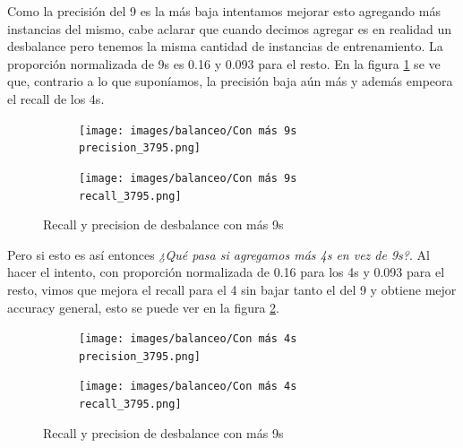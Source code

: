 Como la precisión del 9 es la más baja intentamos mejorar esto agregando más instancias del mismo, cabe aclarar que cuando decimos agregar es en realidad un desbalance pero tenemos la misma cantidad de instancias de entrenamiento. La proporción normalizada de 9s es 0.16 y 0.093 para el resto. En la figura \ref{fig:9s_recall_prec} se ve que, contrario a lo que suponíamos, la precisión baja aún más y además empeora el recall de los 4s.
\begin{figure}[h]
    \centering
    \begin{subfigure}{.5\textwidth}
        \centering
        \texttt{[image: images/balanceo/Con más 9s precision\_3795.png]}
    \end{subfigure}%
    \begin{subfigure}{.5\textwidth}
        \centering
        \texttt{[image: images/balanceo/Con más 9s recall\_3795.png]}
    \end{subfigure}%
    \caption{Recall y precision de desbalance con más 9s}
    \label{fig:9s_recall_prec}
\end{figure}

Pero si esto es así entonces \textit{¿Qué pasa si agregamos más 4s en vez de 9s?}. Al hacer el intento, con proporción normalizada de 0.16 para los 4s y 0.093 para el resto, vimos que mejora el recall para el 4 sin bajar tanto el del 9 y obtiene mejor accuracy general, esto se puede ver en la figura \ref{fig:4s_recall_prec}.
\begin{figure}[h]
    \centering
    \begin{subfigure}{.5\textwidth}
        \centering
        \texttt{[image: images/balanceo/Con más 4s precision\_3795.png]}
    \end{subfigure}%
    \begin{subfigure}{.5\textwidth}
        \centering
        \texttt{[image: images/balanceo/Con más 4s recall\_3795.png]}
    \end{subfigure}%
    \caption{Recall y precision de desbalance con más 9s}
    \label{fig:4s_recall_prec}
\end{figure}

